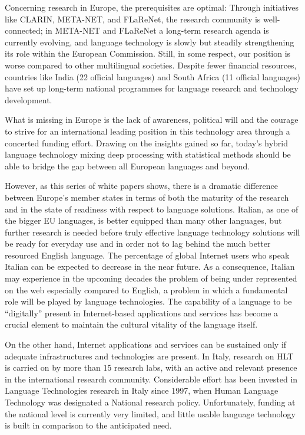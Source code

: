 \begin{multicols}{2}
Concerning research in Europe, the prerequisites are optimal: Through initiatives like CLARIN, META-NET, and FLaReNet, the research community is well-connected; in META-NET and FLaReNet a long-term research agenda is currently evolving, and language technology is slowly but steadily strengthening its role within the European Commission.  Still, in some respect, our position is worse compared to other multilingual societies. Despite fewer financial resources, countries like India (22 official languages) and South Africa (11 official languages) have set up long-term national programmes for language research and technology development.

What is missing in Europe is the lack of awareness, political will and the courage to strive for an international leading position in this technology area through a concerted funding effort.  Drawing on the insights gained so far, today's hybrid language technology mixing deep processing with statistical methods should be able to bridge the gap between all European languages and beyond.

However, as this series of white papers shows, there is a dramatic difference between Europe's member states in terms of both the maturity of the research and in the state of readiness with respect to language solutions. Italian, as one of the bigger EU languages, is better equipped than many other languages, but further research is needed before truly effective language technology solutions will be ready for everyday use and in order not to lag behind the much better resourced English language. The percentage of global Internet users who speak Italian can be expected to decrease in the near future. As a consequence, Italian may experience in the upcoming decades the problem of being under represented on the web especially compared to English, a problem in which a fundamental role will be played by language technologies.  The capability of a language to be “digitally” present in Internet-based applications and services has become a crucial element to maintain the cultural vitality of the language itself.

On the other hand, Internet applications and services can be sustained only if adequate infrastructures and technologies are present.  In Italy, research on HLT is carried on by more than 15 research labs, with an active and relevant presence in the international research community.  Considerable effort has been invested in Language Technologies research in Italy since 1997, when Human Language Technology was designated a National research policy. Unfortunately, funding at the national level is currently very limited, and little usable language technology is built in comparison to the anticipated need.


\end{multicols}
